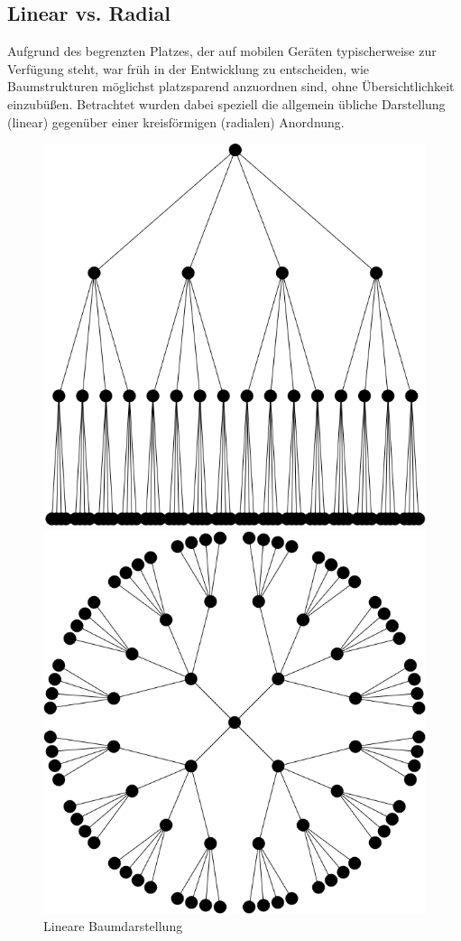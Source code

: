 \subsection{Linear vs. Radial}\label{sec:radial}
Aufgrund des begrenzten Platzes, der auf mobilen Geräten typischerweise zur Verfügung steht, war früh in der Entwicklung zu entscheiden, wie Baumstrukturen möglichst platzsparend anzuordnen sind, ohne Übersichtlichkeit einzubüßen. Betrachtet wurden dabei speziell die allgemein übliche Darstellung (linear) gegenüber einer kreisförmigen (radialen) Anordnung.\\
\begin{figure}
	\centering
	\begin{minipage}{.5\textwidth}
		\centering
		\includegraphics[width=.9\linewidth]{../screenshots/lineargraphexample.PNG}
		\caption{Lineare Baumdarstellung}
		\label{abb:linearbaum}
	\end{minipage}%
	\begin{minipage}{.5\textwidth}
		\centering
		\includegraphics[width=.9\linewidth]{../screenshots/radialgraphexample.PNG}

\end{minipage}
\end{figure}
